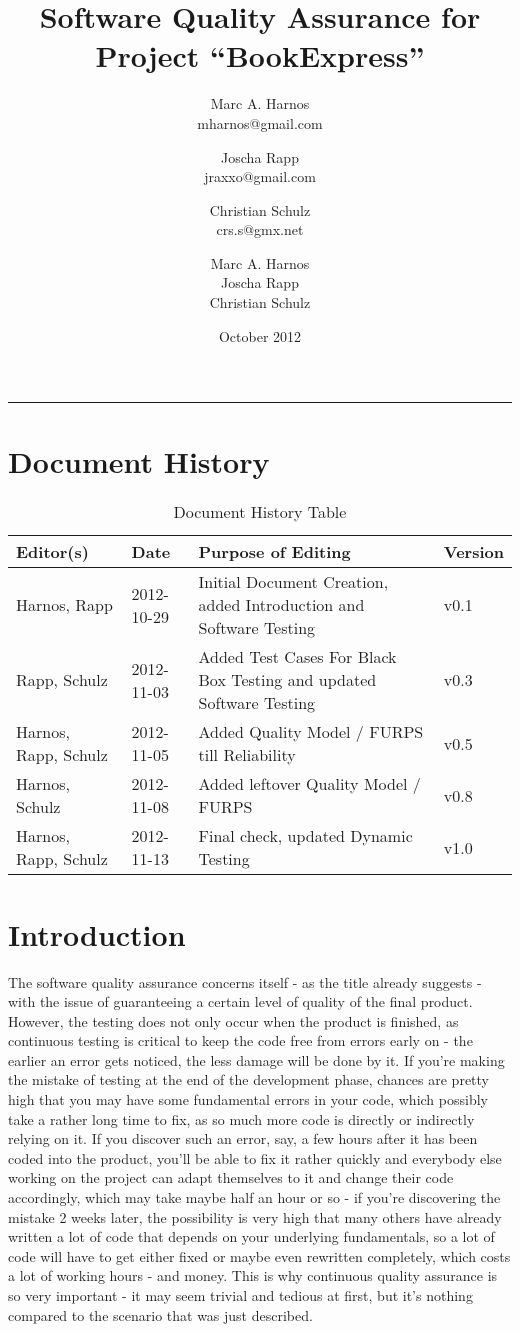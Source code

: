 \documentclass[11pt,a4paper,oneside,svgnames]{report}
\title{Software Quality Assurance for Project ``BookExpress''}
\author{Marc A. Harnos\\ {mharnos@gmail.com} \and Joscha Rapp\\ {jraxxo@gmail.com} \and Christian Schulz\\ {crs.s@gmx.net}}
\author{Marc A. Harnos\\ Joscha Rapp\\ Christian Schulz}
\date{October 2012}
\makeatletter
\renewcommand{\maketitle}{\begin{titlepage}%
    \let\footnotesize\small
    \let\footnoterule\relax
    \parindent \z@
    \reset@font
    \null\vfil
    \begin{flushleft}
      \huge \@title
    \end{flushleft}
    \par
    \hrule height 4pt
    \par
    \begin{flushright}
      \LARGE \@author \par
    \end{flushright}
    \vskip 60\p@
    \vfil\null
  \end{titlepage}%
  \setcounter{footnote}{0}%
}
\makeatother
\begin{document}
\maketitle
\tableofcontents

\chapter*{Document History}

\begin{table}[H]
\centering
\begin{tabular}{|p{3.8cm}|p{2cm}|p{5.5cm}|p{1.2cm}|}
\hline 
Editor(s) & Date & Purpose of Editing & Version \\ 
\hline 
Harnos, Rapp & 2012-10-29 & Initial Document Creation, added Introduction and Software Testing & v0.1 \\ 
\hline
Rapp, Schulz & 2012-11-03 & Added Test Cases For Black Box Testing and updated Software Testing & v0.3 \\ 
\hline
Harnos, Rapp, Schulz & 2012-11-05 & Added Quality Model / FURPS till Reliability & v0.5 \\ 
\hline
Harnos, Schulz & 2012-11-08 & Added leftover Quality Model / FURPS & v0.8 \\ 
\hline
Harnos, Rapp, Schulz & 2012-11-13 & Final check, updated Dynamic Testing & v1.0 \\ 
\hline
\end{tabular} 
\caption{Document History Table}
\label{tab:document-history}
\end{table}

\chapter{Introduction}
The software quality assurance concerns itself - as the title already suggests - with the issue of guaranteeing a certain level of quality of the final product. However, the testing does not only occur when the product is finished, as continuous testing is critical to keep the code free from errors early on - the earlier an error gets noticed, the less damage will be done by it. If you're making the mistake of testing at the end of the development phase, chances are pretty high that you may have some fundamental errors in your code, which possibly take a rather long time to fix, as so much more code is directly or indirectly relying on it. If you discover such an error, say, a few hours after it has been coded into the product, you'll be able to fix it rather quickly and everybody else working on the project can adapt themselves to it and change their code accordingly, which may take maybe half an hour or so - if you're discovering the mistake 2 weeks later, the possibility is very high that many others have already written a lot of code that depends on your underlying fundamentals, so a lot of code will have to get either fixed or maybe even rewritten completely, which costs a lot of working hours - and money. This is why continuous quality assurance is so very important - it may seem trivial and tedious at first, but it's nothing compared to the scenario that was just described.
\end{document}
